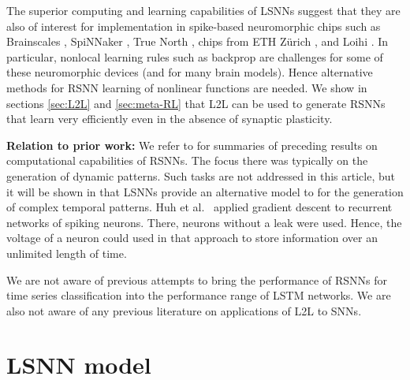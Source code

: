 \documentclass{article} \pdfoutput=1
\begin{document}
The superior computing and learning capabilities of LSNNs suggest that they are also of interest for implementation in spike-based neuromorphic chips such as Brainscales 
\cite{schemmel2010wafer}, SpiNNaker \cite{furber2013overview}, True North \cite{esser_convolutional_2016}, chips from
ETH Z\"urich \cite{qiao2015reconfigurable}, and Loihi \cite{davies2018loihi}. In particular, nonlocal learning rules such as
backprop are challenges for some of these neuromorphic devices (and for many brain models).
Hence alternative methods for RSNN learning of nonlinear functions are needed. We show in sections \ref{sec:L2L} and \ref{sec:meta-RL} that L2L can be used to generate RSNNs that learn very efficiently even in the absence of synaptic plasticity.

\textbf{Relation to prior work:} We refer to \cite{eliasmith2013build,depasquale2016using,huh2017gradient,nicola2017supervised} for summaries of preceding results on computational capabilities of RSNNs. The focus there was typically on the generation of dynamic patterns.
Such tasks are not addressed in this article, but it will be shown in \cite{bellec2018learncompute} that LSNNs provide an alternative model to \cite{nicola2017supervised} for the generation of complex temporal patterns.
Huh et al.~\cite{huh2017gradient} applied gradient descent to recurrent networks of spiking neurons. There, neurons without a leak were used. Hence, the voltage of a neuron could used in that approach to store information over an unlimited length of time.

We are not aware of previous attempts to bring the performance of RSNNs for time series classification into the performance range of LSTM networks. We are also not aware of any previous literature on applications of L2L to SNNs.
















\section{LSNN model}\label{sec:LSNNs}
\end{document}
